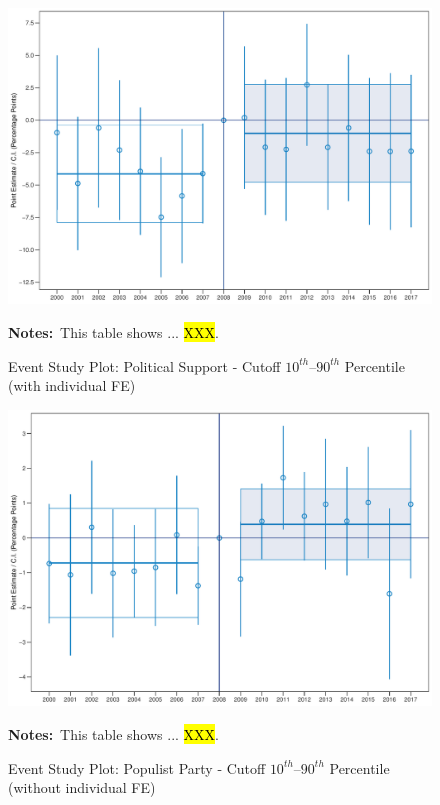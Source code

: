 \documentclass[11pt]{article}
\begin{document}
\begin{figure}[htbp!]
    \centering
    \caption{Event Study Plot: Political Support - Cutoff $10^{th}$--$90^{th}$ Percentile (with individual FE)}\label{fig:dynamic_did_cbk_past_mean_ps_1090_ife}
    \includegraphics[width=1\linewidth]{events/dynamic_did_cbk_past_mean_ps_1090_ife}
    \begin{tablenotes}
        \footnotesize
        \item \textbf{Notes:}~This table shows ... \hl{XXX}.
    \end{tablenotes} 
\end{figure}

\begin{figure}[htbp!]
    \centering
    \caption{Event Study Plot: Populist Party - Cutoff $10^{th}$--$90^{th}$ Percentile (without individual FE)}\label{fig:dynamic_did_cbk_past_mean_pp_1090_noife}
    \includegraphics[width=1\linewidth]{events/dynamic_did_cbk_past_mean_pp_1090_noife}
    \begin{tablenotes}
        \footnotesize
        \item \textbf{Notes:}~This table shows ... \hl{XXX}.
    \end{tablenotes} 
\end{figure}
\end{document}
